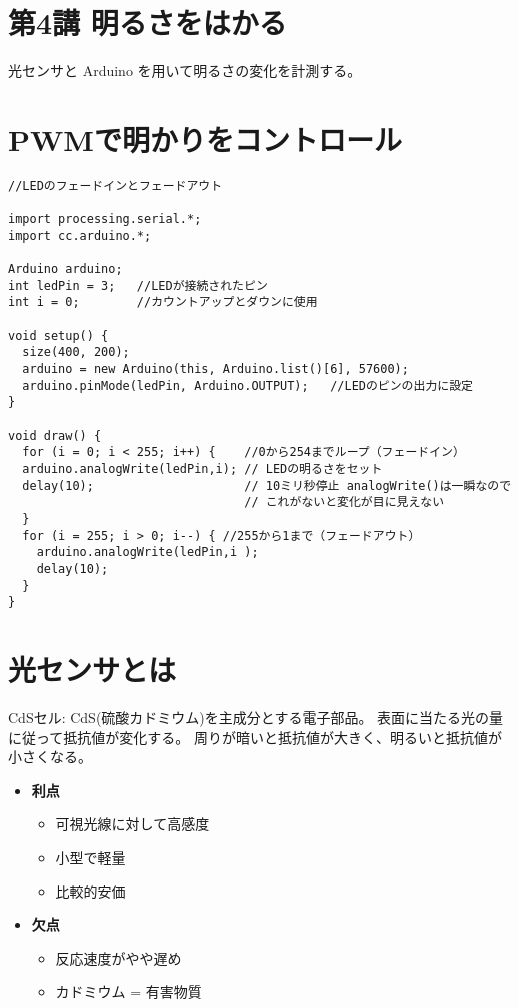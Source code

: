 \documentclass[11pt,a4paper]{jarticle}
\begin{document}
\section*{\LARGE{第4講 明るさをはかる}}
光センサと Arduino を用いて明るさの変化を計測する。

\section{PWMで明かりをコントロール}
\begin{lstlisting}
//LEDのフェードインとフェードアウト

import processing.serial.*;
import cc.arduino.*;
 
Arduino arduino;
int ledPin = 3;   //LEDが接続されたピン
int i = 0;        //カウントアップとダウンに使用
 
void setup() {
  size(400, 200);
  arduino = new Arduino(this, Arduino.list()[6], 57600);
  arduino.pinMode(ledPin, Arduino.OUTPUT);   //LEDのピンの出力に設定
}

void draw() {
  for (i = 0; i < 255; i++) {    //0から254までループ（フェードイン）
  arduino.analogWrite(ledPin,i); // LEDの明るさをセット
  delay(10);                     // 10ミリ秒停止 analogWrite()は一瞬なので
                                 // これがないと変化が目に見えない  
  }
  for (i = 255; i > 0; i--) { //255から1まで（フェードアウト）
    arduino.analogWrite(ledPin,i );
    delay(10);
  }
}
\end{lstlisting}

\section{光センサとは}
CdSセル: CdS(硫酸カドミウム)を主成分とする電子部品。
表面に当たる光の量に従って抵抗値が変化する。
周りが暗いと抵抗値が大きく、明るいと抵抗値が小さくなる。

\begin{itemize}
 \item \textbf{利点}
       \begin{itemize}
	\item 可視光線に対して高感度
	\item 小型で軽量
	\item 比較的安価
       \end{itemize}
 \item \textbf{欠点}
       \begin{itemize}
	\item 反応速度がやや遅め
	\item カドミウム = 有害物質
       \end{itemize}
\end{itemize}
\end{document}
